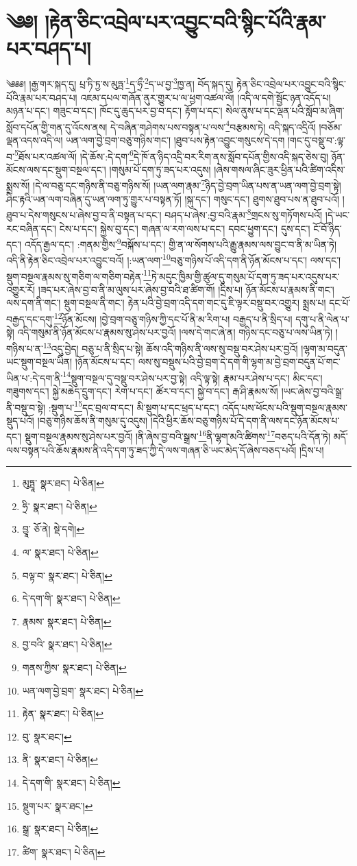 \setcounter{footnote}{0} 
\chapter{༄༅། །རྟེན་ཅིང་འབྲེལ་པར་འབྱུང་བའི་སྙིང་པོའི་རྣམ་པར་བཤད་པ།}༄༅༅། །རྒྱ་གར་སྐད་དུ། པྲ་ཏི་ཏྱ་ས་མུཏྤ་\footnote{མུཏྤཱ་  སྣར་ཐང་།  པེ་ཅིན། }ད་ཧྲྀ་\footnote{ཧྲི་  སྣར་ཐང་།  པེ་ཅིན། }ད་ཡ་བྱ་\footnote{བྱཱ་  ཅོ་ནེ།  སྡེ་དགེ། }ཁྱ་ན། བོད་སྐད་དུ། རྟེན་ཅིང་འབྲེལ་པར་འབྱུང་བའི་སྙིང་པོའི་རྣམ་པར་བཤད་པ། འཇམ་དཔལ་གཞོན་ནུར་གྱུར་པ་ལ་ཕྱག་འཚལ་ལོ། །འདི་ལ་དགེ་སྦྱོང་ཉན་འདོད་པ། མཉན་པ་དང་། གཟུང་བ་དང་། ཁོང་དུ་ཆུད་པར་བྱ་བ་དང་། རྟོག་པ་དང་། སེལ་ནུས་པ་དང་ལྡན་པའི་སློབ་མ་ཞིག་སློབ་དཔོན་གྱི་གན་དུ་འོངས་ནས། དེ་བཞིན་གཤེགས་པས་བསྟན་པ་ལས་\footnote{ལ་  སྣར་ཐང་།  པེ་ཅིན། }བརྩམས་ཏེ། འདི་སྐད་འདྲིའོ། །བཅོམ་ལྡན་འདས་འདི་ལ། ཡན་ལག་བྱེ་བྲག་བཅུ་གཉིས་གང་། །ཐུབ་པས་རྟེན་འབྱུང་གསུངས་དེ་དག །གང་དུ་བསྡུ་བ་:ལྟ་བ་\footnote{བལྟ་བ་  སྣར་ཐང་།  པེ་ཅིན། }ཐོས་པར་འཚལ་ལོ། །དེ་ཆོས་:དེ་དག་\footnote{དེ་དག་གི་  སྣར་ཐང་།  པེ་ཅིན། }དེ་ཁོ་ན་ཉིད་འདྲི་བར་རིག་ནས་སློབ་དཔོན་གྱིས་འདི་སྐད་ཅེས་བུ། ཉོན་མོངས་ལས་དང་སྡུག་བསྔལ་དང་། །གསུམ་པོ་དག་ཏུ་ཟད་པར་འདུས། །ཞེས་གསལ་ཞིང་ཟུར་ཕྱིན་པའི་ཚིག་འདིས་སྨྲས་སོ། །དེ་ལ་བཅུ་དང་གཉིས་ནི་བཅུ་གཉིས་སོ། །ཡན་ལག་རྣམ་\footnote{རྣམས་  སྣར་ཐང་།  པེ་ཅིན། }ཉིད་བྱེ་བྲག་ཡིན་པས་ན་ཡན་ལག་བྱེ་བྲག་སྟེ། ཤིང་རྟའི་ཡན་ལག་བཞིན་དུ་ཡན་ལག་ཏུ་གྱུར་པ་བསྟན་ཏོ། །སྐུ་དང་། གསུང་དང་། ཐུགས་ཐུབ་པས་ན་ཐུབ་པའོ། །ཐུབ་པ་དེས་གསུངས་པ་ཞེས་བྱ་བ་ནི་བསྟན་པ་དང་། བཤད་པ་ཞེས་:བྱ་བའི་རྣམ་\footnote{བྱ་བའི་  སྣར་ཐང་།  པེ་ཅིན། }གྲངས་སུ་གཏོགས་པའོ། །དེ་ཡང་རང་བཞིན་དང་། ངེས་པ་དང་། སྐྱེས་བུ་དང་། གཞན་ལ་རག་ལས་པ་དང་། དབང་ཕྱུག་དང་། དུས་དང་། ངོ་བོ་ཉིད་དང་། འདོད་རྒྱལ་དང་། :གནམ་གྱིས་\footnote{གནས་ཀྱིས་  སྣར་ཐང་།  པེ་ཅིན། }བསྐོས་པ་དང་། གྱི་ན་ལ་སོགས་པའི་རྒྱུ་རྣམས་ལས་བྱུང་བ་ནི་མ་ཡིན་ཏེ། འདི་ནི་རྟེན་ཅིང་འབྲེལ་པར་འབྱུང་བའོ། །:ཡན་ལག་\footnote{ཡན་ལག་བྱེ་བྲག་  སྣར་ཐང་།  པེ་ཅིན། }བཅུ་གཉིས་པོ་འདི་དག་ནི་ཉོན་མོངས་པ་དང་། ལས་དང་། སྡུག་བསྔལ་རྣམས་སུ་གཅིག་ལ་གཅིག་བརྟེན་\footnote{རྟེན་  སྣར་ཐང་།  པེ་ཅིན། }ཏེ་མདུང་ཁྱིམ་གྱི་ཚུལ་དུ་གསུམ་པོ་དག་ཏུ་ཟད་པར་འདུས་པར་འགྱུར་རོ། །ཟད་པར་ཞེས་བྱ་བ་ནི་མ་ལུས་པར་ཞེས་བྱ་བའི་ཐ་ཚིག་གོ། །དྲིས་པ། ཉོན་མོངས་པ་རྣམས་ནི་གང་། ལས་དག་ནི་གང་། སྡུག་བསྔལ་ནི་གང་། རྟེན་པའི་བྱེ་བྲག་འདི་དག་གང་དུ་ཇི་ལྟར་བསྡུ་བར་འགྱུར། སྨྲས་པ། དང་པོ་བརྒྱད་དང་དགུ་\footnote{བུ་  སྣར་ཐང་། }ཉོན་མོངས། །བྱེ་བྲག་བཅུ་གཉིས་ཀྱི་དང་པོ་ནི་མ་རིག་པ། བརྒྱད་པ་ནི་སྲིད་པ། དགུ་པ་ནི་ལེན་པ་སྟེ། འདི་གསུམ་ནི་ཉོན་མོངས་པ་རྣམས་སུ་ཤེས་པར་བྱའོ། །ལས་དེ་གང་ཞེ་ན། གཉིས་དང་བཅུ་པ་ལས་ཡིན་ཏེ། །གཉིས་པ་ན་\footnote{ནི་  སྣར་ཐང་།  པེ་ཅིན། }འདུ་བྱེད། བཅུ་པ་ནི་སྲིད་པ་སྟེ། ཆོས་འདི་གཉིས་ནི་ལས་སུ་བསྡུ་བར་ཤེས་པར་བྱའོ། །ལྷག་མ་བདུན་ཡང་སྡུག་བསྔལ་ཡིན། །ཉོན་མོངས་པ་དང་། ལས་སུ་བསྡུས་པའི་བྱེ་བྲག་དེ་དག་གི་ལྷག་མ་བྱེ་བྲག་བདུན་པོ་གང་ཡིན་པ་:དེ་དག་ནི་\footnote{དེ་དག་གི་  སྣར་ཐང་།  པེ་ཅིན། }སྡུག་བསྔལ་དུ་བསྡུ་བར་ཤེས་པར་བྱ་སྟེ། འདི་ལྟ་སྟེ། རྣམ་པར་ཤེས་པ་དང་། མིང་དང་། གཟུགས་དང་། སྐྱེ་མཆེད་དྲུག་དང་། རེག་པ་དང་། ཚོར་བ་དང་། སྐྱེ་བ་དང་། རྒ་ཤི་རྣམས་སོ། །ཡང་ཞེས་བྱ་བའི་སྒྲ་ནི་བསྡུ་བ་སྟེ། :སྡུག་པ་\footnote{སྡུག་པར་  སྣར་ཐང་། }དང་བྲལ་བ་དང་། མི་སྡུག་པ་དང་ཕྲད་པ་དང་། འདོད་པས་ཕོངས་པའི་སྡུག་བསྔལ་རྣམས་སྡུད་པའོ། །བཅུ་གཉིས་ཆོས་ནི་གསུམ་དུ་འདུས། །དེའི་ཕྱིར་ཆོས་བཅུ་གཉིས་པོ་དེ་དག་ནི་ལས་དང་ཉོན་མོངས་པ་དང་། སྡུག་བསྔལ་རྣམས་སུ་ཤེས་པར་བྱའོ། །ནི་ཞེས་བྱ་བའི་སྒྲས་\footnote{སྒྲ་  སྣར་ཐང་།  པེ་ཅིན། }ནི་ལྷག་མའི་ཚིགས་\footnote{ཚིག་  སྣར་ཐང་།  པེ་ཅིན། }བཅད་པའི་དོན་ཏེ། མདོ་ལས་བསྟན་པའི་ཆོས་རྣམས་ནི་འདི་དག་ཏུ་ཟད་ཀྱི་དེ་ལས་གཞན་ཅི་ཡང་མེད་དོ་ཞེས་བཅད་པའོ། །དྲིས་པ། 